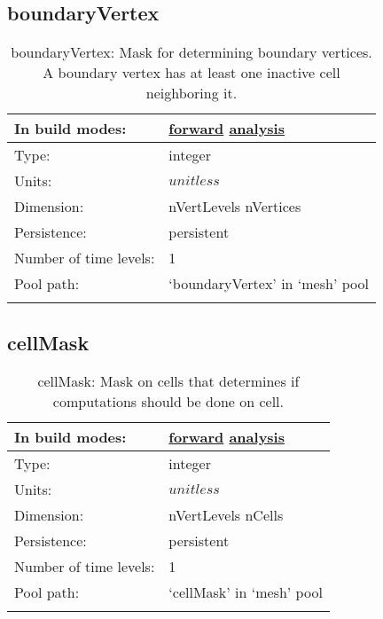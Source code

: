 \subsection[boundaryVertex]{boundaryVertex}
\label{subsec:var_sec_mesh_boundaryVertex}
\begin{center}
\begin{longtable}{| p{2.0in} | p{4.0in} |}
        \hline 
        In build modes: & \hyperref[subsec:forward_var_tab_mesh]{forward} \hyperref[subsec:analysis_var_tab_mesh]{analysis} \\
        \hline 
        Type: & integer \\
        \hline 
        Units: & $unitless$ \\
        \hline 
        Dimension: & nVertLevels nVertices \\
        \hline 
        Persistence: & persistent \\
        \hline 
        Number of time levels: & 1 \\
        \hline 
            Pool path: & `boundaryVertex' in `mesh' pool \\
		 \hline 
    \caption{boundaryVertex: Mask for determining boundary vertices. A boundary vertex has at least one inactive cell neighboring it.}
\end{longtable}
\end{center}
\subsection[cellMask]{cellMask}
\label{subsec:var_sec_mesh_cellMask}
\begin{center}
\begin{longtable}{| p{2.0in} | p{4.0in} |}
        \hline 
        In build modes: & \hyperref[subsec:forward_var_tab_mesh]{forward} \hyperref[subsec:analysis_var_tab_mesh]{analysis} \\
        \hline 
        Type: & integer \\
        \hline 
        Units: & $unitless$ \\
        \hline 
        Dimension: & nVertLevels nCells \\
        \hline 
        Persistence: & persistent \\
        \hline 
        Number of time levels: & 1 \\
        \hline 
            Pool path: & `cellMask' in `mesh' pool \\
		 \hline 
    \caption{cellMask: Mask on cells that determines if computations should be done on cell.}
\end{longtable}
\end{center}
